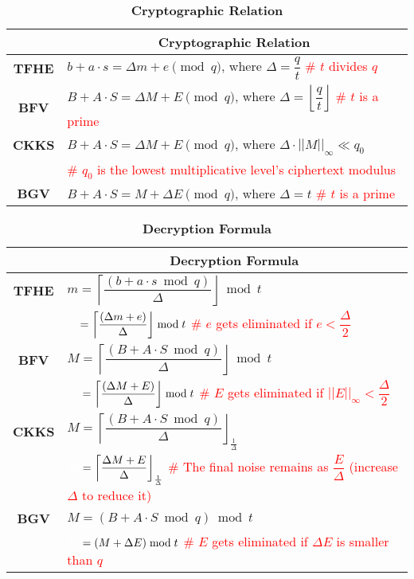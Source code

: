 \begin{table}[h]
\begin{tabular}{|c||l|}
\hline
&\multicolumn{1}{c|}{\textbf{Cryptographic Relation}}\\\hline\hline
\textbf{TFHE}&$b + a\cdot s = \Delta m + e \pmod q$, \text{ } where $\Delta = \dfrac{q}{t}$  \text{ } \textcolor{red}{\# $t$ divides $q$}\\\hline
\textbf{BFV}&$B + A\cdot S = \Delta M + E \pmod q$, \text{ } where $\Delta = \left\lfloor\dfrac{q}{t}\right\rfloor$ \text{ } \textcolor{red}{\# $t$ is a prime}\\\hline
\textbf{CKKS}&$B + A\cdot S = \Delta M + E \pmod q$, \text{ } where $\Delta \cdot ||M||_\infty \ll q_0$\\
& \text{ } \textcolor{red}{\# $q_0$ is the lowest multiplicative level's ciphertext modulus}\\\hline
\textbf{BGV}&$B + A\cdot S = M + \Delta E \pmod q$, \text{ } where $\Delta = t$  \text{ } \textcolor{red}{\# $t$ is a prime}\\\hline
\end{tabular}
\caption{\textbf{Cryptographic Relation}}
\end{table}


\begin{table}[h]
\begin{tabular}{|c||l|}
\hline
&\multicolumn{1}{c|}{\textbf{Decryption Formula}}\\\hline\hline
\textbf{TFHE}&$m = \left\lceil\dfrac{(b + a\cdot s \bmod q)}{\Delta}\right\rfloor \bmod t$\\
&$\textcolor{white}{m} = \left\lceil\dfrac{(\Delta m + e)}{\Delta}\right\rfloor \bmod t$ \text{ } \textcolor{red}{ \# $e$ gets eliminated if $e < \dfrac{\Delta}{2}$}\\\hline
\textbf{BFV}&$M = \left\lceil\dfrac{(B + A\cdot S \bmod q)}{\Delta}\right\rfloor  \bmod t$\\
&$\textcolor{white}{M} = \left\lceil\dfrac{(\Delta M + E)}{\Delta}\right\rfloor  \bmod t$ \text{ } \textcolor{red}{ \# $E$ gets eliminated if $||E||_\infty < \dfrac{\Delta}{2}$}\\\hline
\textbf{CKKS}&$M = \left\lceil\dfrac{(B + A\cdot S \bmod q)}{\Delta}\right\rfloor_{\frac{1}{\Delta}}$\\
&$\textcolor{white}{M} = \left\lceil\dfrac{\Delta M + E}{\Delta}\right\rfloor_{\frac{1}{\Delta}}$ \text{ } \textcolor{red}{ \# The final noise remains as $\dfrac{E}{\Delta}$ (increase $\Delta$ to reduce it)}\\\hline
\textbf{BGV}&$M = (B + A\cdot S \bmod q) \bmod t$\\
&$\textcolor{white}{M} = (M + \Delta E) \bmod t$ \text{ } \textcolor{red}{ \# $E$ gets eliminated if $\Delta E$ is smaller than $q$}\\\hline
\end{tabular}
\caption{\textbf{Decryption Formula}}
\end{table}

